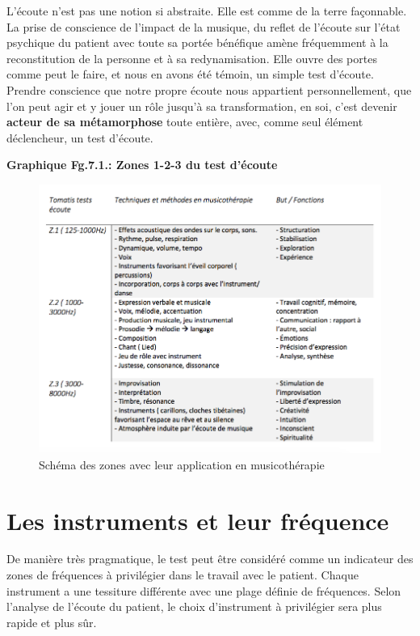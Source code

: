 L'écoute n'est pas une notion si abstraite. Elle est comme de la terre façonnable.
 La prise de conscience de l'impact de la musique, du reflet de
 l'écoute sur l'état psychique du patient avec toute sa portée
 bénéfique amène fréquemment à la reconstitution de la personne et à
 sa redynamisation. Elle ouvre des portes comme peut le faire, et nous
 en avons été témoin, un simple test d'écoute. 
  Prendre conscience que notre propre écoute nous appartient
  personnellement, que l'on peut agir et y jouer un rôle jusqu'à sa
  transformation, en soi, c'est devenir \textbf{ acteur de sa
  métamorphose} toute entière, avec, comme seul élément déclencheur, un
  test d'écoute.

\textbf{Graphique Fg.7.1.: Zones 1-2-3 du test d'écoute}
 \begin{figure}
	\centering
	\includegraphics[width=1\linewidth]{images/testtechnmethbut}
	\caption[Zones du test avec la musicothérapie]{Schéma des
          zones avec leur application en musicothérapie}
       
	\label{testbutetfonction}
\end{figure}


  

  \section{Les instruments et leur fréquence }
 De manière très pragmatique, le test peut être
considéré comme un indicateur des zones de fréquences à
privilégier dans le travail avec le patient. Chaque instrument a une tessiture
différente avec une plage
définie de fréquences. Selon l'analyse de l'écoute du patient, le choix
d'instrument à privilégier sera plus rapide et plus sûr.

